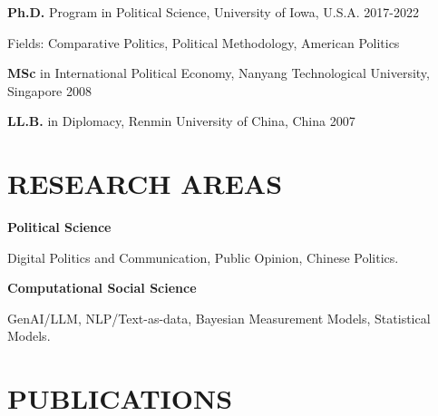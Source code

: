 \documentclass[10.5pt,]{article}
\providecommand{\tightlist}{%
	\setlength{\itemsep}{0pt}\setlength{\parskip}{0pt}}
\renewenvironment{itemize}{
	\begin{list}{}{
			\setlength{\leftmargin}{1.5em}
		}
	}{
	\end{list}
}
\begin{document}
\begin{itemize}
\tightlist
\item
  \textbf{Ph.D.} Program in Political Science, University of Iowa,
  U.S.A. \hfill 2017-2022

  \begin{itemize}
  \tightlist
  \item
    Fields: Comparative Politics, Political Methodology, American
    Politics
  \end{itemize}
\item
  \textbf{MSc} in International Political Economy, Nanyang Technological
  University, Singapore \hfill 2008
\item
  \textbf{LL.B.} in Diplomacy, Renmin University of China, China
  \hfill 2007
\end{itemize}

\section{RESEARCH AREAS}\label{research-areas}

\begin{itemize}
\tightlist
\item
  \textbf{Political Science}

  \begin{itemize}
  \tightlist
  \item
    Digital Politics and Communication, Public Opinion, Chinese
    Politics.
  \end{itemize}
\item
  \textbf{Computational Social Science}

  \begin{itemize}
  \tightlist
  \item
    GenAI/LLM, NLP/Text-as-data, Bayesian Measurement Models,
    Statistical Models.
  \end{itemize}
\end{itemize}

\section{PUBLICATIONS}\label{publications}
\end{document}
